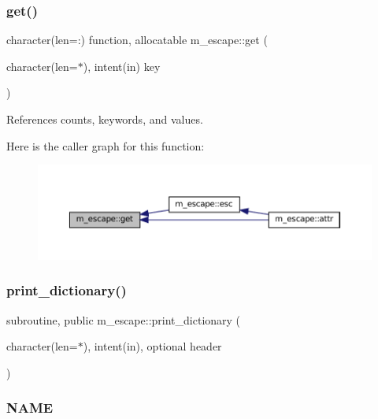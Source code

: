 \subsubsection{\texorpdfstring{get()}{get()}}
{\footnotesize\ttfamily character(len=\+:) function, allocatable m\+\_\+escape\+::get (\begin{DoxyParamCaption}\item[{character(len=$\ast$), intent(in)}]{key }\end{DoxyParamCaption})\hspace{0.3cm}{\ttfamily [private]}}



References counts, keywords, and values.

Here is the caller graph for this function\+:\nopagebreak
\begin{figure}[H]
\begin{center}
\leavevmode
\includegraphics[width=350pt]{namespacem__escape_af555c90c278ff964d8bce93ee0368a42_icgraph}
\end{center}
\end{figure}
\mbox{\label{namespacem__escape_a6add907828fd34e94b87f643a5cabc64}} 
\subsubsection{\texorpdfstring{print\+\_\+dictionary()}{print\_dictionary()}}
{\footnotesize\ttfamily subroutine, public m\+\_\+escape\+::print\+\_\+dictionary (\begin{DoxyParamCaption}\item[{character(len=$\ast$), intent(in), optional}]{header }\end{DoxyParamCaption})}



\subsubsection*{N\+A\+ME}

